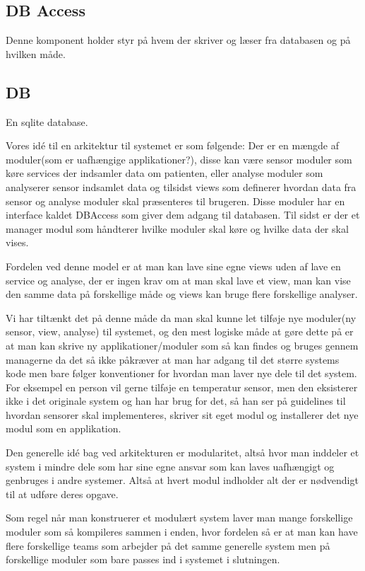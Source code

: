 \subsection*{DB Access}
Denne komponent holder styr på hvem der skriver og læser fra databasen og på hvilken måde.

\subsection*{DB}
En sqlite database.

Vores idé til en arkitektur til systemet er som følgende:
Der er en mængde af moduler(som er uafhængige applikationer?), disse kan være sensor moduler som køre services der indsamler data om patienten, eller analyse moduler som analyserer sensor indsamlet data og tilsidst views som definerer hvordan data fra sensor og analyse moduler skal præsenteres til brugeren. Disse moduler har en interface kaldet DBAccess som giver dem adgang til databasen. Til sidst er der et manager modul som håndterer hvilke moduler skal køre og hvilke data der skal vises.

Fordelen ved denne model er at man kan lave sine egne views uden af lave en service og analyse, der er ingen krav om at man skal lave et view, man kan vise den samme data på forskellige måde og views kan bruge flere forskellige analyser.

Vi har tiltænkt det på denne måde da man skal kunne let tilføje nye moduler(ny sensor, view, analyse) til systemet, og den mest logiske måde at gøre dette på er at man kan skrive ny applikationer/moduler som så kan findes og bruges gennem managerne da det så ikke påkræver at man har adgang til det større systems kode men bare følger konventioner for hvordan man laver nye dele til det system. For eksempel en person vil gerne tilføje en temperatur sensor, men den eksisterer ikke i det originale system og han har brug for det, så han ser på guidelines til hvordan sensorer skal implementeres, skriver sit eget modul og installerer det nye modul som en applikation.

Den generelle idé bag ved arkitekturen er modularitet, altså hvor man inddeler et system i mindre dele som har sine egne ansvar som kan laves uafhængigt og genbruges i andre systemer. Altså at hvert modul indholder alt der er nødvendigt til at udføre deres opgave.

Som regel når man konstruerer et modulært system laver man mange forskellige moduler som så kompileres sammen i enden, hvor fordelen så er at man kan have flere forskellige teams som arbejder på det samme generelle system men på forskellige moduler som bare passes ind i systemet i slutningen. 

